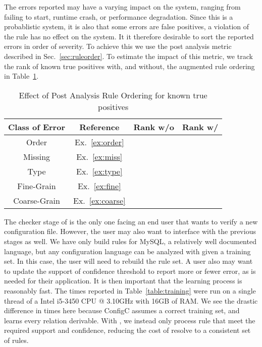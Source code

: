 The errors reported may have a varying impact on the system, ranging from failing to start, runtime crash, or performance degradation.
Since this is a probablistic system, it is also that some errors are false positives, a violation of the rule has no effect on the system.
It it therefore desirable to sort the reported errors in order of severity. 
To achieve this we use the post analysis metric described in Sec.~\ref{sec:ruleorder}.
To estimate the impact of this metric, we track the rank of known true positives with, and without, the augmented rule ordering in Table~\ref{table:order}.

\begin{table}[h]
\centering
\caption{Effect of Post Analysis Rule Ordering for known true positives}
\label{table:order}
\setlength{\tabcolsep}{1em}
\begin{tabular}{|c|c|c|c|}
\hline
{\bf Class of Error} & {\bf Reference} & {\bf Rank w/o} & {\bf Rank w/} \\
\hline
\hline
Order        & Ex.~\ref{ex:order}   & & \\ 
Missing      & Ex.~\ref{ex:miss}    & & \\ 
Type         & Ex.~\ref{ex:type}    & & \\ 
Fine-Grain   & Ex.~\ref{ex:fine}    & & \\ 
Coarse-Grain & Ex.~\ref{ex:coarse}  & & \\ 
\hline
\end{tabular}
\end{table}

The checker stage of \app is the only one facing an end user that wants to verify a new configuration file.
However, the user may also want to interface with the previous stages as well. 
We have only build rules for MySQL, a relatively well documented language, but any configuration language can be analyzed with \app given a training set.
In this case, the user will need to rebuild the rule set.
A user also may want to update the support of confidence threshold to report more or fewer error, as is needed for their application.
It is then important that the learning process is reasonably fast.
The times reported in Table~\ref{table:training} were run on a single thread of a Intel i5-3450 CPU @ 3.10GHz with 16GB of RAM.
We see the drastic difference in times here because ConfigC assumes a correct training set, and learns every relation derivable.
With \app, we instead only process rule that meet the required support and confidence, reducing the cost of resolve to a consistent set of rules.


